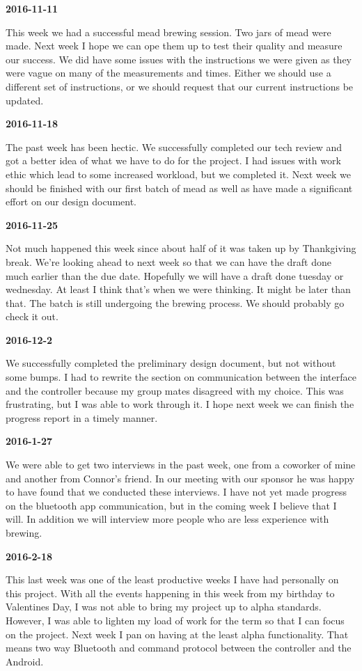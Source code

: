 \textbf{2016-11-11}

This week we had a successful mead brewing session. Two jars of mead were made. Next week I hope we can ope them up to test their quality and measure our success. We did have some issues with the instructions we were given as they were vague on many of the measurements and times. Either we should use a different set of instructions, or we should request that our current instructions be updated.

\textbf{2016-11-18}

The past week has been hectic. We successfully completed our tech review and got a better idea of what we have to do for the project. I had issues with work ethic which lead to some increased workload, but we completed it. Next week we should be finished with our first batch of mead as well as have made a significant effort on our design document.

\textbf{2016-11-25}

Not much happened this week since about half of it was taken up by Thankgiving break. We're looking ahead to next week so that we can have the draft done much earlier than the due date. Hopefully we will have a draft done tuesday or wednesday. At least I think that's when we were thinking. It might be later than that. The batch is still undergoing the brewing process. We should probably go check it out.

\textbf{2016-12-2}

We successfully completed the preliminary design document, but not without some bumps. I had to rewrite the section on communication between the interface and the controller because my group mates disagreed with my choice. This was frustrating, but I was able to work through it. I hope next week we can finish the progress report in a timely manner.

\textbf{2016-1-27}

We were able to get two interviews in the past week, one from a coworker of mine and another from Connor's friend. In our meeting with our sponsor he was happy to have found that we conducted these interviews. I have not yet made progress on the bluetooth app communication, but in the coming week I believe that I will. In addition we will interview more people who are less experience with brewing.

\textbf{2016-2-18}

This last week was one of the least productive weeks I have had personally on this project. With all the events happening in this week from my birthday to Valentines Day, I was not able to bring my project up to alpha standards. However, I was able to lighten my load of work for the term so that I can focus on the project. Next week I pan on having at the least alpha functionality. That means two way Bluetooth and command protocol between the controller and the Android.

